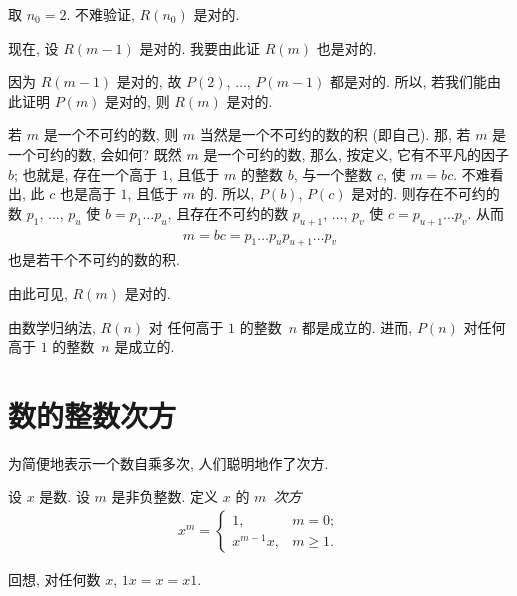 \documentclass[../libro.tex]{subfiles}
\begin{document}
\begin{example}
    取 \(n_0 = 2\).
    不难验证, \(R(n_0)\) 是对的.

    现在, 设 \(R(m-1)\) 是对的.
    我要由此证 \(R(m)\) 也是对的.

    因为 \(R(m-1)\) 是对的,
    故 \(P(2)\), \(\dots\), \(P(m-1)\) 都是对的.
    所以, 若我们能由此证明 \(P(m)\) 是对的,
    则 \(R(m)\) 是对的.

    若 \(m\) 是一个不可约的数,
    则 \(m\) 当然是一个不可约的数的积 (即自己).
    那, 若 \(m\) 是一个可约的数, 会如何?
    既然 \(m\) 是一个可约的数,
    那么, 按定义, 它有不平凡的因子 \(b\);
    也就是, 存在一个高于 \(1\), 且低于 \(m\) 的整数 \(b\),
    与一个整数 \(c\),
    使 \(m = bc\).
    不难看出,
    此 \(c\) 也是高于 \(1\), 且低于 \(m\) 的.
    所以, \(P(b)\), \(P(c)\) 是对的.
    则存在不可约的数
    \(p_1\), \(\dots\), \(p_u\)
    使 \(b = p_1 \dots p_u\),
    且存在不可约的数
    \(p_{u+1}\), \(\dots\), \(p_v\)
    使 \(c = p_{u+1} \dots p_v\).
    从而
    \begin{align*}
        m = bc = p_1 \dots p_u p_{u+1} \dots p_v
    \end{align*}
    也是若干个不可约的数的积.

    由此可见, \(R(m)\) 是对的.

    由数学归纳法, \(R(n)\) 对%
    任何高于 \(1\) 的整数~\(n\) 都是成立的.
    进而, \(P(n)\) 对任何高于 \(1\) 的整数~\(n\) 是成立的.
\end{example}

\section{数的整数次方}

为简便地表示一个数自乘多次,
人们聪明地作了次方.

\begin{definition}
    设 \(x\) 是数.
    设 \(m\) 是非负整数.
    定义 \(x\) 的 \(m\)~\emph{次方}
    \begin{align*}
        x^m =
        \begin{cases}
            1,         & m = 0;    \\
            x^{m-1} x, & m \geq 1.
        \end{cases}
    \end{align*}
\end{definition}

回想, 对任何数 \(x\), \(1 x = x = x 1\).
\end{document}
